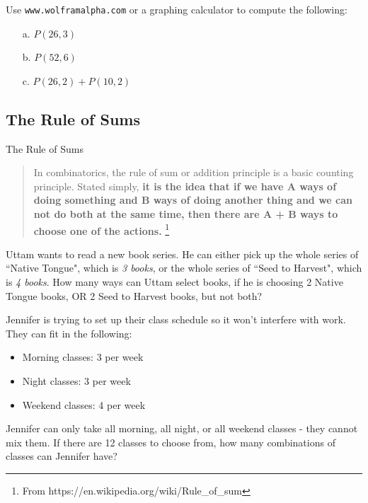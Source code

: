 {    
    \begin{questionNOGRADE}{\thequestion}
        Use \texttt{www.wolframalpha.com} or a graphing calculator to compute the following:

        \begin{enumerate}
            \item[a.]   $P(26, 3)$
            \item[b.]   $P(52, 6)$
            \item[c.]   $P(26, 2) + P(10, 2)$
        \end{enumerate}
    \end{questionNOGRADE}

    \newpage
    
    \subsection{The Rule of Sums}

    \begin{intro}{The Rule of Sums}
        \begin{quote}
            In combinatorics, the rule of sum or addition principle is a basic counting principle.
            Stated simply,
            \textbf{it is the idea that if we have A ways of doing something and B ways of doing
            another thing and we can not do both at the same time, then there are A + B ways to choose one of the actions.}
            \footnote{From https://en.wikipedia.org/wiki/Rule\_of\_sum}
        \end{quote}
    \end{intro}

    \begin{questionNOGRADE}{\thequestion}
        Uttam wants to read a new book series. He can either pick up
        the whole series of ``Native Tongue", which is \textit{3 books},
        or the whole series
        of ``Seed to Harvest", which is \textit{4 books}.
        How many ways can Uttam select books, if he is choosing 2 Native Tongue books, OR
        2 Seed to Harvest books, but not both?
    \end{questionNOGRADE}

    \hrulefill

    \begin{questionNOGRADE}{\thequestion}
        Jennifer is trying to set up their class schedule so it won't
        interfere with work. They can fit in the following:
        \begin{itemize}
            \item Morning classes: 3 per week
            \item Night classes: 3 per week
            \item Weekend classes: 4 per week
        \end{itemize}
        Jennifer can only take all morning, all night, or all weekend classes -
        they cannot mix them.
        If there are 12 classes to choose from, how many combinations of classes can Jennifer have?       
    \end{questionNOGRADE}
        
}
